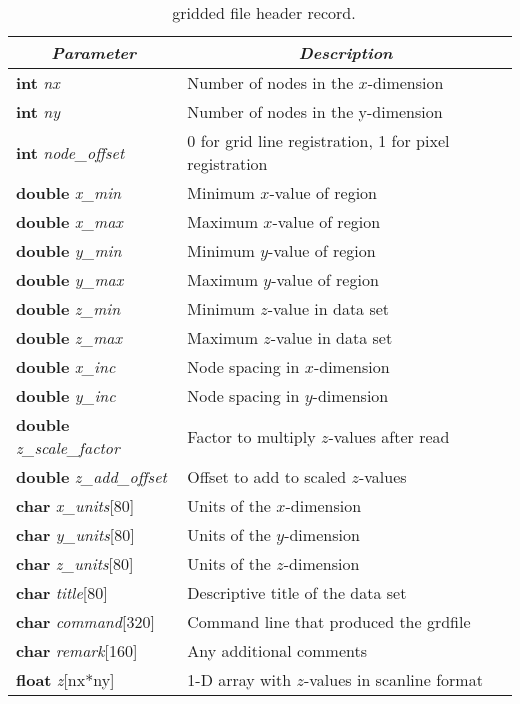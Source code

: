 \begin{table}
\centering
\begin{tabular}{|l|l|} \hline
\multicolumn{1}{|c}{\emph{Parameter}}	&	\multicolumn{1}{|c|}{\emph{Description}}	\\ \hline
{\bf int} {\it nx}			&	Number of nodes in the $x$-dimension	\\ \hline
{\bf int} {\it ny}			&	Number of nodes in the y-dimension	\\ \hline
{\bf int} {\it node\_offset}	&	0 for grid line registration, 1 for pixel registration  \\ \hline
{\bf double} {\it x\_min}		&	Minimum $x$-value of region	\\ \hline
{\bf double} {\it x\_max}		&	Maximum $x$-value of region  \\ \hline
{\bf double} {\it y\_min}		&	Minimum $y$-value of region  \\ \hline
{\bf double} {\it y\_max}		&	Maximum $y$-value of region  \\ \hline
{\bf double} {\it z\_min}		&	Minimum $z$-value in data set  \\ \hline
{\bf double} {\it z\_max}		&	Maximum $z$-value in data set  \\ \hline
{\bf double} {\it x\_inc}		&	Node spacing in $x$-dimension  \\ \hline
{\bf double} {\it y\_inc}		&	Node spacing in $y$-dimension  \\ \hline
{\bf double} {\it z\_scale\_factor}	&	Factor to multiply $z$-values after read  \\ \hline
{\bf double} {\it z\_add\_offset}	&	Offset to add to scaled $z$-values  \\ \hline
{\bf char} {\it x\_units}[80]	&	Units of the $x$-dimension	\\ \hline
{\bf char} {\it y\_units}[80]	&	Units of the $y$-dimension	\\ \hline
{\bf char} {\it z\_units}[80]	&	Units of the $z$-dimension	\\ \hline 
{\bf char} {\it title}[80]	&	Descriptive title of the data set	\\ \hline
{\bf char} {\it command}[320]	&	Command line that produced the grdfile	\\ \hline
{\bf char} {\it remark}[160]	&	Any additional comments	\\ \hline \hline
{\bf float} {\it z}[nx*ny]	&	1-D array with $z$-values in scanline format \\ \hline

\end{tabular} 

\caption{\gmt\ gridded file header record.}
\label{tbl:grdheader}
\end{table}

